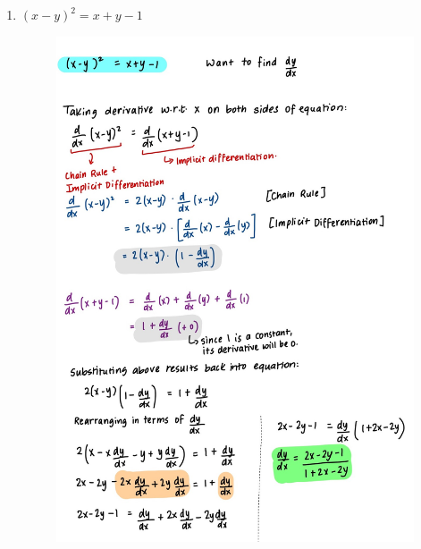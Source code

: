 \documentclass{article}
\begin{document}
\begin{enumerate}
    \item $(x-y)^2 = x + y - 1$
    \begin{figure}[H]
        \centering
        \includegraphics[width=0.85\linewidth]{Q4.jpg}
        \label{fig:Q4}
    \end{figure}


\end{enumerate}
\end{document}
